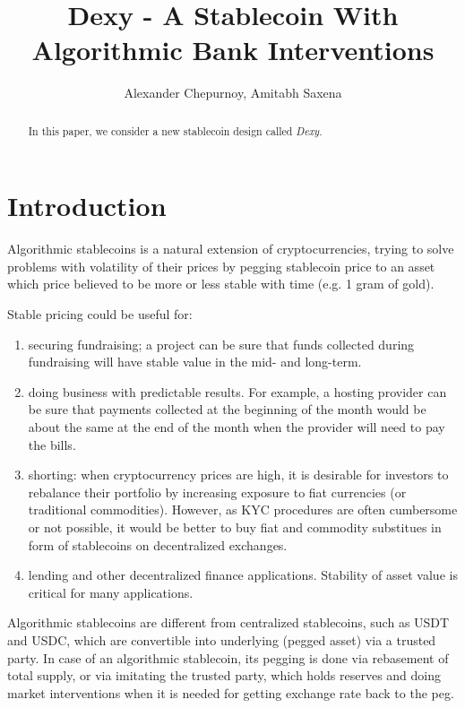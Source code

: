 \documentclass{article}   %
\begin{document}
\title{Dexy - A Stablecoin With Algorithmic Bank Interventions}
\author{Alexander Chepurnoy, Amitabh Saxena}


\maketitle

\begin{abstract}
In this paper, we consider a new stablecoin design called \em{Dexy}.
\end{abstract}

% 

\section{Introduction}

Algorithmic stablecoins is a natural extension of cryptocurrencies, trying to 
solve problems with volatility of their prices by pegging stablecoin price to an
asset which price believed to be more or less stable with time (e.g. 1 gram of gold).  

Stable pricing could be useful for:
\begin{enumerate}
\item securing fundraising; a project can be sure that funds collected during fundraising will have stable value in the mid- and long-term.
\item doing business with predictable results. For example, a hosting provider can be sure that payments collected at the beginning of the month 
      would be about the same at the end of the month when the provider will need to pay the bills. 
\item shorting: when cryptocurrency prices are high, it is desirable for investors to rebalance their portfolio by increasing exposure to fiat currencies (or traditional
 commodities). However, as KYC procedures are often cumbersome or not possible, it would be better to buy fiat and commodity substitues in form of stablecoins on decentralized exchanges.
\item lending and other decentralized finance applications. Stability of asset value is critical for many applications.
\end{enumerate}

Algorithmic stablecoins are different from centralized stablecoins, such as USDT and USDC, which are 
convertible into underlying (pegged asset) via a trusted party. In case of an algorithmic stablecoin, its 
pegging is done via rebasement of total supply, or via imitating the trusted party, which holds reserves and doing market interventions when it is needed for getting exchange rate back to the peg. 
\end{document}
